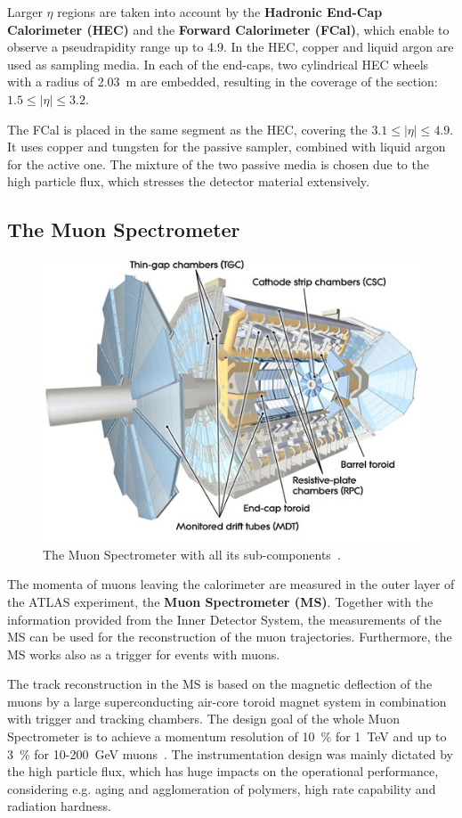  Larger $\eta$ regions are taken into account by the \textbf{Hadronic End-Cap Calorimeter (HEC)} and the \textbf{Forward Calorimeter (FCal)}, which enable to observe a pseudrapidity range up to 4.9.  In the HEC, copper and liquid argon are used as sampling media. In each of the end-caps, two cylindrical HEC wheels with a radius of 2.03~m are embedded, resulting in the coverage of the section: $1.5 \leq \mid\eta\mid \leq3.2$.

 The FCal is placed in the same segment as the HEC, covering the $3.1 \leq \mid\eta\mid \leq 4.9$. It uses copper and tungsten for the passive sampler, combined with liquid argon for the active one. The mixture of the two passive media is chosen due to the high particle flux, which stresses the detector material extensively.




\subsection{The Muon Spectrometer}\label{MD}

\begin{figure}[h]
	\centering
	\includegraphics[width=0.65\linewidth]{Pics/cp3/36}
	\caption{The Muon Spectrometer with all its sub-components~\cite{Aad:2008zzm}.} 
	\label{fig:36}
\end{figure}

 The momenta of muons leaving the calorimeter are measured in the outer layer of the ATLAS experiment, the \textbf{Muon Spectrometer (MS)}. Together with the information provided from the Inner Detector System, the measurements of the MS can be used for the reconstruction of the muon trajectories. Furthermore, the MS works also as a trigger for events with muons.

The track reconstruction in the MS is based on the magnetic deflection of the muons by a large superconducting air-core toroid magnet system in combination with  trigger and tracking chambers. The design goal of the whole Muon Spectrometer is to achieve a momentum resolution of 10~\% for 1~TeV and up to 3~\% for 10-200~GeV muons~\cite{ATLAS:1999uwa}. The instrumentation design was mainly dictated by the high particle flux, which has huge impacts on the operational performance, considering e.g. aging and agglomeration of polymers, high rate capability and radiation hardness.

